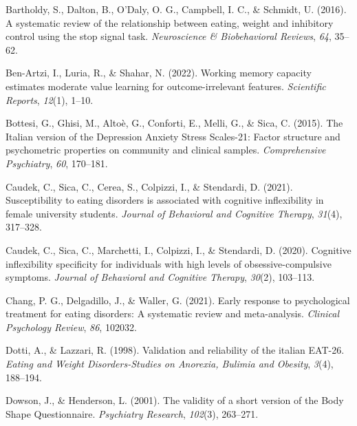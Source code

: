 \documentclass[
  man,floatsintext]{apa6}
\newlength{\cslhangindent}
\newlength{\cslentryspacingunit} %
\newenvironment{CSLReferences}[2] %
 {%
  \setlength{\parindent}{0pt}
  \ifodd #1
  \let\oldpar\par
  \def\par{\hangindent=\cslhangindent\oldpar}
  \fi
  \setlength{\parskip}{#2\cslentryspacingunit}
 }%
 {}
\begin{document}
\hypertarget{refs}{}
\begin{CSLReferences}{1}{0}
\leavevmode{}%
Bartholdy, S., Dalton, B., O'Daly, O. G., Campbell, I. C., \& Schmidt, U. (2016). A systematic review of the relationship between eating, weight and inhibitory control using the stop signal task. \emph{Neuroscience \& Biobehavioral Reviews}, \emph{64}, 35--62.

\leavevmode{}%
Ben-Artzi, I., Luria, R., \& Shahar, N. (2022). Working memory capacity estimates moderate value learning for outcome-irrelevant features. \emph{Scientific Reports}, \emph{12}(1), 1--10.

\leavevmode{}%
Bottesi, G., Ghisi, M., Altoè, G., Conforti, E., Melli, G., \& Sica, C. (2015). {The Italian version of the Depression Anxiety Stress Scales-21: Factor structure and psychometric properties on community and clinical samples}. \emph{Comprehensive Psychiatry}, \emph{60}, 170--181.

\leavevmode{}%
Caudek, C., Sica, C., Cerea, S., Colpizzi, I., \& Stendardi, D. (2021). Susceptibility to eating disorders is associated with cognitive inflexibility in female university students. \emph{Journal of Behavioral and Cognitive Therapy}, \emph{31}(4), 317--328.

\leavevmode{}%
Caudek, C., Sica, C., Marchetti, I., Colpizzi, I., \& Stendardi, D. (2020). Cognitive inflexibility specificity for individuals with high levels of obsessive-compulsive symptoms. \emph{Journal of Behavioral and Cognitive Therapy}, \emph{30}(2), 103--113.

\leavevmode{}%
Chang, P. G., Delgadillo, J., \& Waller, G. (2021). Early response to psychological treatment for eating disorders: A systematic review and meta-analysis. \emph{Clinical Psychology Review}, \emph{86}, 102032.

\leavevmode{}%
Dotti, A., \& Lazzari, R. (1998). Validation and reliability of the italian {EAT-26}. \emph{Eating and Weight Disorders-Studies on Anorexia, Bulimia and Obesity}, \emph{3}(4), 188--194.

\leavevmode{}%
Dowson, J., \& Henderson, L. (2001). The validity of a short version of the {Body Shape Questionnaire}. \emph{Psychiatry Research}, \emph{102}(3), 263--271.


\end{CSLReferences}
\end{document}

